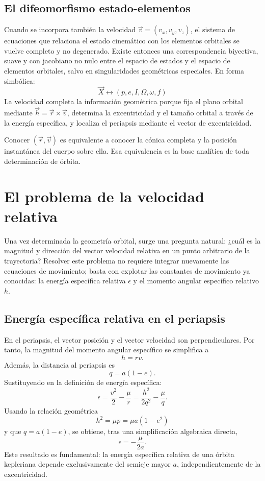 \subsection{El difeomorfismo estado-elementos}
Cuando se incorpora también la velocidad \(\vec{v}=(v_x,v_y,v_z)\), el sistema de ecuaciones que relaciona el estado cinemático con los elementos orbitales se vuelve completo y no degenerado. Existe entonces una correspondencia biyectiva, suave y con jacobiano no nulo entre el espacio de estados y el espacio de elementos orbitales, salvo en singularidades geométricas especiales. En forma simbólica:
\[
\vec{X} \longleftrightarrow (p,e,I,\Omega,\omega,f)
\]
La velocidad completa la información geométrica porque fija el plano orbital mediante \(\vec{h}=\vec{r}\times\vec{v}\), determina la excentricidad y el tamaño orbital a través de la energía específica, y localiza el periapsis mediante el vector de excentricidad.

\begin{importante}
Conocer \((\vec{r},\vec{v})\) es equivalente a conocer la cónica completa y la posición instantánea del cuerpo sobre ella. Esa equivalencia es la base analítica de toda determinación de órbita.
\end{importante}

\section{El problema de la velocidad relativa}
Una vez determinada la geometría orbital, surge una pregunta natural: ¿cuál es la magnitud y dirección del vector velocidad relativa en un punto arbitrario de la trayectoria? Resolver este problema no requiere integrar nuevamente las ecuaciones de movimiento; basta con explotar las constantes de movimiento ya conocidas: la energía específica relativa \(\epsilon\) y el momento angular específico relativo \(h\).

\subsection{Energía específica relativa en el periapsis}
En el periapsis, el vector posición y el vector velocidad son perpendiculares. Por tanto, la magnitud del momento angular específico se simplifica a
\[
 h = rv.
\]
Además, la distancia al periapsis es
\[
 q = a(1-e).
\]
Sustituyendo en la definición de energía específica:
\[
\epsilon = \frac{v^2}{2} - \frac{\mu}{r} = \frac{h^2}{2q^2} - \frac{\mu}{q}.
\]
Usando la relación geométrica
\[
 h^2 = \mu p = \mu a(1-e^2)
\]
y que \(q=a(1-e)\), se obtiene, tras una simplificación algebraica directa,
\[
\epsilon = -\frac{\mu}{2a}.
\]
Este resultado es fundamental: la energía específica relativa de una órbita kepleriana depende exclusivamente del semieje mayor \(a\), independientemente de la excentricidad.

